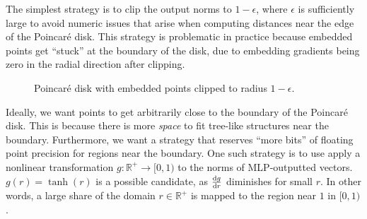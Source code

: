 \documentclass{article}
\begin{document}
The simplest strategy is to clip the output norms to $1-\epsilon$, where $\epsilon$ is sufficiently large to avoid numeric issues that arise when computing distances near the edge of the Poincaré disk. This strategy is problematic in practice because embedded points get ``stuck'' at the boundary of the disk, due to embedding gradients being zero in the radial direction after clipping.

\begin{figure}[ht]
  \centering
  \caption{Poincaré disk with embedded points clipped to radius $1 - \epsilon$.}
  \label{fig:poincare-disk-epsilon}
\end{figure}

Ideally, we want points to get arbitrarily close to the boundary of the Poincaré disk. This is because there is more \emph{space} to fit tree-like structures near the boundary. Furthermore, we want a strategy that reserves ``more bits'' of floating point precision for regions near the boundary. One such strategy is to use apply a nonlinear transformation $g: \mathbb R^+ \to [0, 1)$ to the norms of MLP-outputted vectors. $g(r) = \tanh(r)$ is a possible candidate, as $\dv{g}{r}$ diminishes for small $r$. In other words, a large share of the domain $r \in \mathbb R^+$ is mapped to the region near $1$ in $[0, 1)$.
\end{document}
